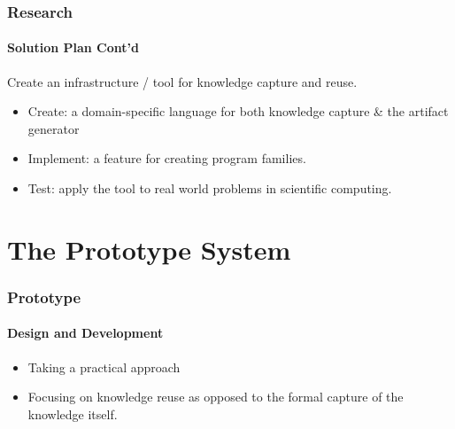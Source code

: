 \documentclass{beamer}
\begin{document}


\begin{frame}

\frametitle{Research}
\framesubtitle{Solution Plan Cont'd}

Create an infrastructure / tool for knowledge capture and reuse.

\begin{itemize}
\item Create: a domain-specific language for both knowledge capture \& the 
	artifact	generator
\item Implement: a feature for creating program families. %
\item Test: apply the tool to real world problems in scientific computing.


\end{itemize}
\end{frame}


\section[Prototype]{The Prototype System}


\begin{frame}

\frametitle{Prototype}
\framesubtitle{Design and Development}

\begin{itemize}
\item Taking a practical approach
\item Focusing on knowledge reuse as opposed to the formal capture of the
				knowledge itself.
\end{itemize}

\end{frame}
\end{document}
